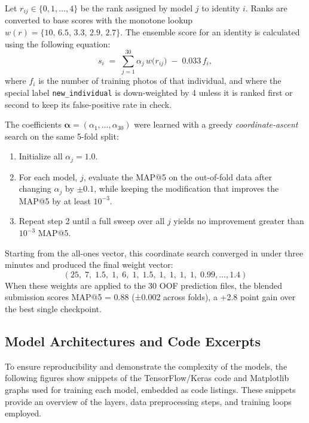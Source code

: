 \documentclass[twocolumn]{article}
\begin{document}
Let \(r_{ij}\!\in\!\{0,1,\dots,4\}\) be the rank assigned by model \(j\) to identity \(i\).
Ranks are converted to base scores with the monotone lookup \(w(r)=\{10,\,6.5,\,3.3,\,2.9,\,2.7\}\).
The ensemble score for an identity is calculated using the following equation:
\begin{equation*}
s_i\;=\;\sum_{j=1}^{30}\alpha_j\,w\!\bigl(r_{ij}\bigr)\;-\;0.033\,f_i,
\end{equation*}
where \(f_i\) is the number of training photos of that individual, and where the special label \texttt{new\_individual} is down-weighted by 4 unless it is ranked first or second to keep its false-positive rate in check.

The coefficients \(\boldsymbol{\alpha} \!=\! (\alpha_1,\dots,\alpha_{30})\) were learned with a greedy \emph{coordinate-ascent} search on the same 5-fold split:

\begin{enumerate}
  \item Initialize all \(\alpha_j = 1.0\).
  \item For each model, \(j\), evaluate the MAP@5 on the out-of-fold data after changing \(\alpha_j\) by \(\pm0.1\), while keeping the modification that improves the MAP@5 by at least $10^{-3}$.
  \item Repeat step 2 until a full sweep over all \(j\) yields no improvement greater than $10^{-3}$ MAP@5.
\end{enumerate}

Starting from the all-ones vector, this coordinate search converged in under three minutes and produced the final weight vector:
\begin{equation*}
(25,\;7,\;1.5,\;1,\;6,\;1,\;1.5,\;1,\;1,\;1,\;1,\;0.99,\ldots,1.4)
\end{equation*}
When these weights are applied to the 30 OOF prediction files, the blended submission scores MAP@5 = 0.88 (±0.002 across folds), a +2.8 point gain over the best single checkpoint.

\subsection{Model Architectures and Code Excerpts}

To ensure reproducibility and demonstrate the complexity of the models, the following figures show snippets of the TensorFlow/Keras code and Matplotlib graphs used for training each model, embedded as code listings. These snippets provide an overview of the layers, data preprocessing steps, and training loops employed.
\end{document}
